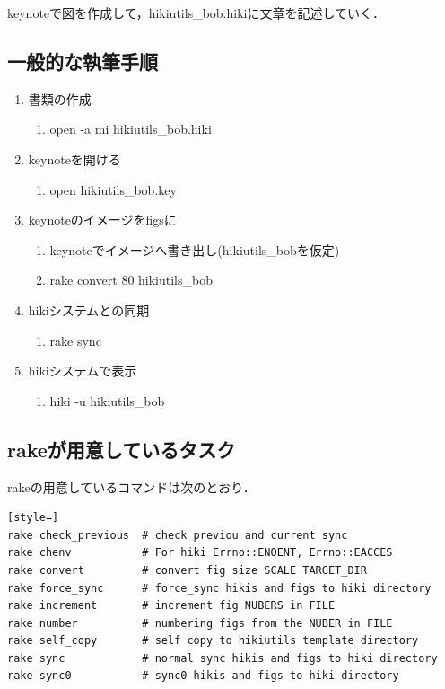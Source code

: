 keynoteで図を作成して，hikiutils\_bob.hikiに文章を記述していく．

\subsection{一般的な執筆手順}
\begin{enumerate}
\item 書類の作成
\begin{enumerate}
\item open -a mi hikiutils\_bob.hiki
\end{enumerate}
\item keynoteを開ける
\begin{enumerate}
\item open hikiutils\_bob.key
\end{enumerate}
\item keynoteのイメージをfigsに
\begin{enumerate}
\item keynoteでイメージへ書き出し(hikiutils\_bobを仮定)
\item rake convert 80 hikiutils\_bob
\end{enumerate}
\item hikiシステムとの同期
\begin{enumerate}
\item rake sync
\end{enumerate}
\item hikiシステムで表示
\begin{enumerate}
\item hiki -u hikiutils\_bob
\end{enumerate}
\end{enumerate}
\subsection{rakeが用意しているタスク}
rakeの用意しているコマンドは次のとおり．
\begin{lstlisting}[style=]
rake check_previous  # check previou and current sync
rake chenv           # For hiki Errno::ENOENT, Errno::EACCES
rake convert         # convert fig size SCALE TARGET_DIR
rake force_sync      # force_sync hikis and figs to hiki directory
rake increment       # increment fig NUBERS in FILE
rake number          # numbering figs from the NUBER in FILE
rake self_copy       # self copy to hikiutils template directory
rake sync            # normal sync hikis and figs to hiki directory
rake sync0           # sync0 hikis and figs to hiki directory
\end{lstlisting}
